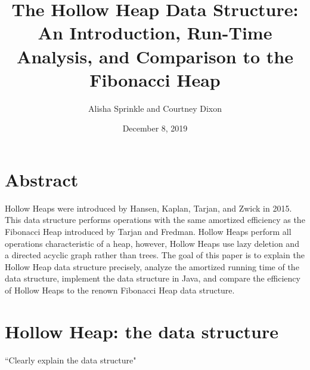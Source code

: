 \documentclass[letter,10pt]{article}
\begin{document}
\title{The Hollow Heap Data Structure: An Introduction, Run-Time Analysis, and Comparison to the Fibonacci Heap}
\author{Alisha Sprinkle and Courtney Dixon}
\date{December 8, 2019}
\maketitle

\section{Abstract}
\qquad Hollow Heaps were introduced by Hansen, Kaplan, Tarjan, and Zwick in 2015. This data structure performs operations with the same amortized efficiency as the Fibonacci Heap introduced by Tarjan and Fredman. Hollow Heaps perform all operations characteristic of a heap, however, Hollow Heaps use lazy deletion and a directed acyclic graph rather than trees. The goal of this paper is to explain the Hollow Heap data structure precisely, analyze the amortized running time of the data structure, implement the data structure in Java, and compare the efficiency of Hollow Heaps to the renown Fibonacci Heap data structure.

\section{Hollow Heap: the data structure}
``Clearly explain the data structure"\\
\end{document}
